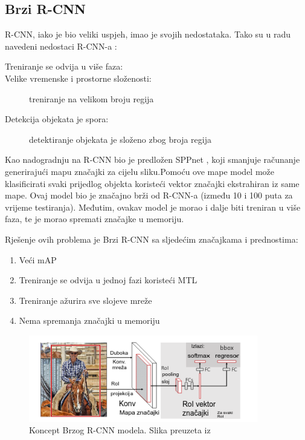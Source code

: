 \subsection{Brzi R-CNN}
R-CNN, iako je bio veliki uspjeh, imao je svojih nedostataka.
Tako su u radu \cite{DBLP:journals/corr/Girshick15} navedeni nedostaci R-CNN-a : 
\begin{description}
    \item [Treniranje se odvija u više faza:]
    \item [Velike vremenske i prostorne složenosti:]treniranje na velikom broju regija
    \item [Detekcija objekata je spora:]detektiranje objekata je složeno zbog broja regija
\end{description}
Kao nadogradnju na R-CNN bio je predložen SPPnet , koji smanjuje 
računanje generirajući mapu značajki za cijelu sliku.\newline Pomoću ove mape model može klasificirati svaki prijedlog objekta
koristeći vektor značajki ekstrahiran iz same mape.
Ovaj model bio je značajno brži od R-CNN-a (između 10 i 100 puta za vrijeme testiranja). Međutim, ovakav model je morao 
i dalje biti treniran u više faza, te je morao spremati značajke u memoriju.\newline

Rješenje ovih problema je Brzi R-CNN sa sljedećim značajkama i prednostima:
\begin{enumerate}
    \item Veći mAP 
    \item Treniranje se odvija u jednoj fazi koristeći MTL 
    \item Treniranje ažurira sve slojeve mreže
    \item Nema spremanja značajki u memoriju
\end{enumerate}

\begin{figure}[htb]
    \centering
    \includegraphics[width=10cm]{img/Fast-RCNN.png}
    \caption{Koncept Brzog R-CNN modela. Slika preuzeta iz \citep{DBLP:journals/corr/Girshick15}}
    \label{fig:Koncept Brzog R-CNN modela}
\end{figure}

